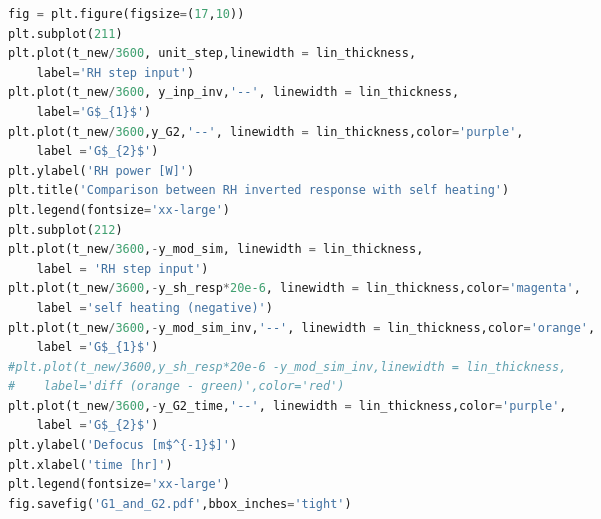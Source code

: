 \begin{spacing}{1.2} \begin{lstlisting}[frame=single,language=Python]
fig = plt.figure(figsize=(17,10))
plt.subplot(211)
plt.plot(t_new/3600, unit_step,linewidth = lin_thickness,
    label='RH step input')
plt.plot(t_new/3600, y_inp_inv,'--', linewidth = lin_thickness,
    label='G$_{1}$')
plt.plot(t_new/3600,y_G2,'--', linewidth = lin_thickness,color='purple',
    label ='G$_{2}$')
plt.ylabel('RH power [W]')
plt.title('Comparison between RH inverted response with self heating')
plt.legend(fontsize='xx-large')
plt.subplot(212)
plt.plot(t_new/3600,-y_mod_sim, linewidth = lin_thickness,
    label = 'RH step input')
plt.plot(t_new/3600,-y_sh_resp*20e-6, linewidth = lin_thickness,color='magenta',
    label ='self heating (negative)')
plt.plot(t_new/3600,-y_mod_sim_inv,'--', linewidth = lin_thickness,color='orange',
    label ='G$_{1}$')
#plt.plot(t_new/3600,y_sh_resp*20e-6 -y_mod_sim_inv,linewidth = lin_thickness,
#    label='diff (orange - green)',color='red')
plt.plot(t_new/3600,-y_G2_time,'--', linewidth = lin_thickness,color='purple',
    label ='G$_{2}$')
plt.ylabel('Defocus [m$^{-1}$]')
plt.xlabel('time [hr]')
plt.legend(fontsize='xx-large')
fig.savefig('G1_and_G2.pdf',bbox_inches='tight')
\end{lstlisting} \end{spacing}

